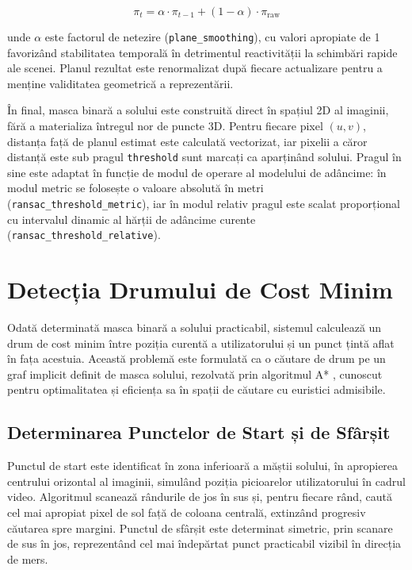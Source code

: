 \begin{equation}
    \pi_t = \alpha \cdot \pi_{t-1} + (1 - \alpha) \cdot \pi_{\text{raw}}
\end{equation}

\noindent unde $\alpha$ este factorul de netezire (\texttt{plane\_smoothing}), cu valori apropiate de 1 favorizând stabilitatea temporală în detrimentul reactivității la schimbări rapide ale scenei. Planul rezultat este renormalizat după fiecare actualizare pentru a menține validitatea geometrică a reprezentării.

\par În final, masca binară a solului este construită direct în spațiul 2D al imaginii, fără a materializa întregul nor de puncte 3D. Pentru fiecare pixel $(u, v)$, distanța față de planul estimat este calculată vectorizat, iar pixelii a căror distanță este sub pragul \texttt{threshold} sunt marcați ca aparținând solului. Pragul în sine este adaptat în funcție de modul de operare al modelului de adâncime: în modul metric se folosește o valoare absolută în metri (\texttt{ransac\_threshold\_metric}), iar în modul relativ pragul este scalat proporțional cu intervalul dinamic al hărții de adâncime curente (\texttt{ransac\_threshold\_relative}).

\section{Detecția Drumului de Cost Minim}
\label{sec:ch3sec6}

\par Odată determinată masca binară a solului practicabil, sistemul calculează un drum de cost minim între poziția curentă a utilizatorului și un punct țintă aflat în fața acestuia. Această problemă este formulată ca o căutare de drum pe un graf implicit definit de masca solului, rezolvată prin algoritmul A* \cite{4082128}, cunoscut pentru optimalitatea și eficiența sa în spații de căutare cu euristici admisibile.

\subsection{Determinarea Punctelor de Start și de Sfârșit}

\par Punctul de start este identificat în zona inferioară a măștii solului, în apropierea centrului orizontal al imaginii, simulând poziția picioarelor utilizatorului în cadrul video. Algoritmul scanează rândurile de jos în sus și, pentru fiecare rând, caută cel mai apropiat pixel de sol față de coloana centrală, extinzând progresiv căutarea spre margini. Punctul de sfârșit este determinat simetric, prin scanare de sus în jos, reprezentând cel mai îndepărtat punct practicabil vizibil în direcția de mers.

